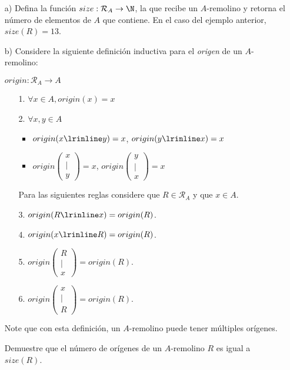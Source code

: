 \begin{enumerate}
  \item[a)] Defina la función $size: \mathcal{R}_A \rightarrow \N$, la que
  recibe un $A$-remolino y retorna el número de elementos de $A$ que contiene.
  En el caso del ejemplo anterior, $size(R) = 13$.
  \item[b)] Considere la siguiente definición inductiva para el \textit{origen}
  de un $A$-remolino:

  $origin: \mathcal{R}_A \rightarrow A$
  \begin{enumerate}
    \item[1.] $\forall x \in A, origin(x) = x$
    \item[2.] $\forall x, y \in A$
    \begin{itemize}
        \item $ origin(x \lrinline y) = x$, $origin(y \lrinline x) = x$

        \item
           $origin\left(\begin{matrix}
           x\\
           |\\
           y
         \end{matrix}\right) = x$,
         $origin\left(\begin{matrix}
         y\\
         |\\
         x
       \end{matrix}\right) = x$
    \end{itemize}
    Para las siguientes reglas considere que $R \in \mathcal{R}_A$ y que $x \in A$.
    \item[3.] $origin(R \lrinline x) = origin(R)$.
    \item[4.] $origin(x \lrinline R) = origin(R)$.
    \item[5.] $origin\left(\begin{matrix}R \\ | \\ x \end{matrix}\right) = origin(R)$.
    \item[6.] $origin\left(\begin{matrix}x \\ | \\ R \end{matrix}\right) = origin(R)$.
  \end{enumerate}
  Note que con esta definición, un $A$-remolino puede tener múltiples orígenes.

  Demuestre que el número de orígenes de un $A$-remolino $R$ es igual a $size(R)$.
\end{enumerate}